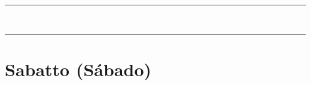 \documentclass[10pt,twoside]{book}
\begin{document}
\vspace{0.5em}

{}

\iralfinal

\vspace{0.5em}

\begin{center}
      \begin{spacing}{0.25}
            {\rule{20em}{0.4pt}}\\
            {\rule{20em}{0.4pt}}
      \end{spacing}
\end{center}



\section*{\centering Sabatto (Sábado)}
\end{document}
